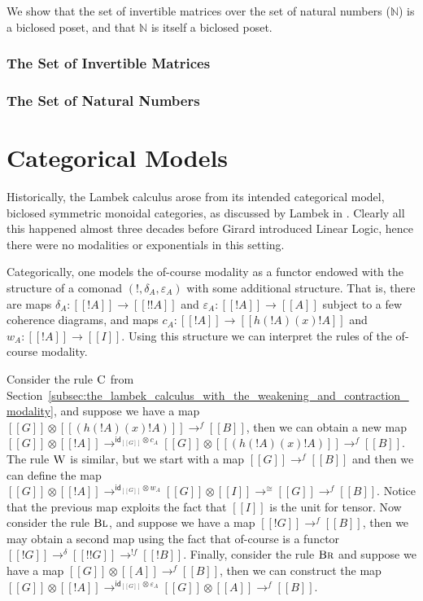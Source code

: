 \documentclass{article}
\let\mto\to                     %
\let\to\relax                   %
\newcommand{\to}{\rightarrow}
\newcommand{\id}{\mathsf{id}}
\begin{document}
We show that the set of invertible matrices over the set of natural
numbers ($\mathbb{N}$) is a biclosed poset, and that $\mathbb{N}$ is
itself a biclosed poset.

\subsubsection{The Set of Invertible Matrices}
\label{subsec:the_set_of_invertible_matrices}


\subsubsection{The Set of Natural Numbers}
\label{subsec:the_set_of_natural_numbers}


\section{Categorical Models}

Historically, the Lambek calculus arose from its intended categorical
model, biclosed symmetric monoidal categories, as discussed by Lambek
in \cite{lambek1988}. Clearly all this happened almost three decades
before Girard introduced Linear Logic, hence there were no modalities
or exponentials in this setting.


Categorically, one models the of-course modality as a functor endowed
with the structure of a comonad $(!, \delta_A, \varepsilon_A)$ with
some additional structure.  That is, there are maps
$\delta_A : [[!A]] \mto [[!!A]]$ and $\varepsilon_A : [[!A]] \mto [[A]]$
subject to a few coherence diagrams, and maps $c_A : [[!A]] \mto
[[h(!A) (x) !A]]$ and $w_A : [[!A]] \mto [[I]]$.  Using this structure we can
interpret the rules of the of-course modality.

Consider the rule $\textsc{C}$ from Section~\ref{subsec:the_lambek_calculus_with_the_weakening_and_contraction_modality},
and suppose we have a map $[[G]]
\otimes [[(h(!A) (x) !A)]] \mto^{f} [[B]]$, then we can obtain a new
map $[[G]] \otimes [[!A]] \mto^{\id_{[[G]]} \otimes c_A} [[G]] \otimes
[[(h(!A) (x) !A)]] \mto^f [[B]]$.  The rule $\textsc{W}$ is
similar, but we start with a map $[[G]] \mto^f [[B]]$ and then we can
define the map $[[G]] \otimes [[!A]] \mto^{\id_{[[G]]} \otimes w_A}
[[G]] \otimes [[I]] \mto^\cong [[G]] \mto^{f} [[B]]$.  Notice that the
previous map exploits the fact that $[[I]]$ is the unit for tensor.
Now consider the rule $\textsc{Bl}$, and suppose we have a map
$[[!{G}]] \mto^f [[B]]$, then we may obtain a second map using the
fact that of-course is a functor $[[!{G}]] \mto^{\delta} [[!{!{G}}]]
\mto^{!f} [[!B]]$.  Finally, consider the rule $\textsc{Br}$ and
suppose we have a map $[[G]] \otimes [[A]] \mto^f [[B]]$, then we can
construct the map $[[G]] \otimes [[!A]] \mto^{\id_{[[G]]} \otimes
  \varepsilon_A} [[G]] \otimes [[A]] \mto^f [[B]]$.
\end{document}
